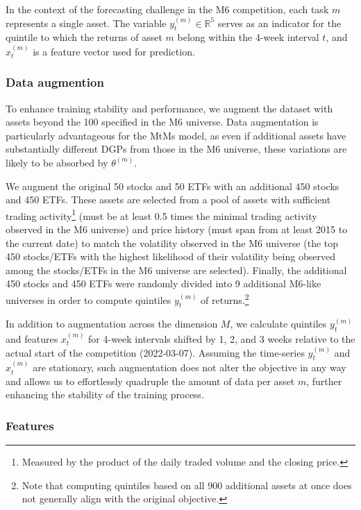 \documentclass[3p,times,twocolumn]{elsarticle}
\begin{document}
In the context of the forecasting challenge in the M6 competition, each task $m$ represents a single asset. 
The variable $y_{t}^{(m)}\in\mathbb{R}^{5}$ serves as an indicator for the quintile to which the returns of asset $m$ belong within the 4-week interval $t$, and $x_{t}^{(m)}$ is a feature vector used for prediction.

\subsubsection{Data augmention}

To enhance training stability and performance, we augment the dataset with assets beyond the 100 specified in the M6 universe.
Data augmentation is particularly advantageous for the MtMs model, as even if additional assets have substantially different DGPs from those in the M6 universe, these variations are likely to be absorbed by $\theta^{(m)}$.

We augment the original 50 stocks and 50 ETFs with an additional 450 stocks and 450 ETFs.
These assets are selected from a pool of assets with sufficient trading activity\footnote{Measured by the product of the daily traded volume and the closing price.} (must be at least 0.5 times the minimal trading activity observed in the M6 universe) and price history (must span from at least 2015 to the current date) to match the volatility observed in the M6 universe (the top 450 stocks/ETFs with the highest likelihood of their volatility being observed among the stocks/ETFs in the M6 universe are selected).
Finally, the additional 450 stocks and 450 ETFs were randomly divided into 9 additional M6-like universes in order to compute quintiles $y_{t}^{(m)}$ of returns.\footnote{
    Note that computing quintiles based on all 900 additional assets at once does not generally align with the original objective.
}

In addition to augmentation across the dimension $M$, we calculate quintiles $y_{t}^{(m)}$ and features $x_{t}^{(m)}$ for 4-week intervals shifted by 1, 2, and 3 weeks relative to the actual start of the competition (2022-03-07).
Assuming the time-series $y_{t}^{(m)}$ and $x_{t}^{(m)}$ are stationary, such augmentation does not alter the objective in any way and allows us to effortlessly quadruple the amount of data per asset $m$, further enhancing the stability of the training process.

\subsubsection{Features}
\end{document}
